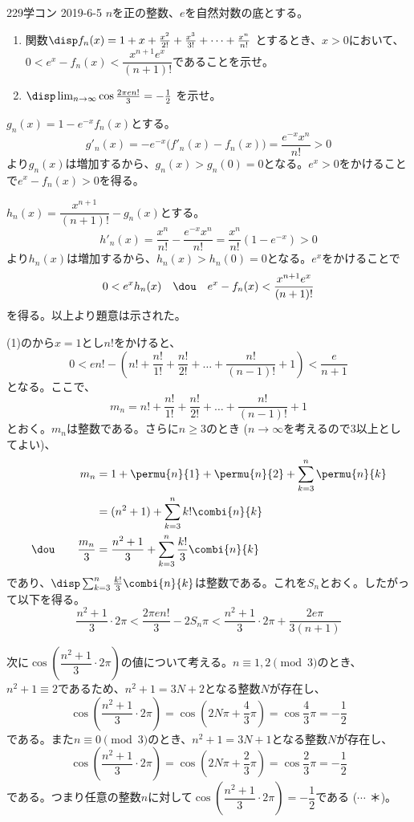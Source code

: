 \begin{prob}{229}{}{学コン 2019-6-5}
 $n$を正の整数、$e$を自然対数の底とする。
 \begin{enumerate}
  \item 関数$\disp f_n(x)=1+x+\frac{x^2}{2!}+\frac{x^3}{3!}+\dots +\frac{x^n}{n!}$ とするとき、$x>0$において、$0<e^x-f_n(x)<\dfrac{x^{n+1}e^x}{(n+1)!}$であることを示せ。
  \item $\disp \lim_{n\to\infty} \cos\frac{2\pi e n!}{3}=-\frac{1}{2}$ を示せ。
 \end{enumerate}
\end{prob}


$g_n(x)=1-e^{-x}f_n(x)$とする。
\[ g'_n(x)=-e^{-x}\bigl(f'_n(x)-f_n(x)\bigr)=\frac{e^{-x}x^n}{n!}>0 \]
より$g_n(x)$は増加するから、$g_n(x)>g_n(0)=0$となる。$e^x>0$をかけることで$e^x-f_n(x)>0$を得る。

$h_n(x)=\dfrac{x^{n+1}}{(n+1)!}-g_n(x)$とする。
\[ h'_n(x)=\frac{x^n}{n!}-\frac{e^{-x}x^n}{n!}=\frac{x^n}{n!}(1-e^{-x})>0 \]
より$h_n(x)$は増加するから、$h_n(x)>h_n(0)=0$となる。$e^x$をかけることで
\[ 0<e^xh_n(x) \quad\dou\quad e^x-f_n(x)<\frac{x^{n+1}e^x}{(n+1)!} \]
を得る。以上より題意は示された。


(1)のから$x=1$とし$n!$をかけると、
\[ 0<en!-\left(n!+\frac{n!}{1!}+\frac{n!}{2!}+\dots +\frac{n!}{(n-1)!}+1\right) < \frac{e}{n+1} \]
となる。ここで、
\[ m_n=n!+\frac{n!}{1!}+\frac{n!}{2!}+\dots +\frac{n!}{(n-1)!}+1 \]
とおく。$m_n$は整数である。さらに$n\ge 3$のとき ($n\to\infty$を考えるので3以上としてよい)、
\begin{align*}
 m_n&= 1+\permu{n}{1}+\permu{n}{2}+\sum_{k=3}^n\permu{n}{k} \\
 &= (n^2+1)+\sum_{k=3}^nk!\combi{n}{k} \\
 \dou\qquad \frac{m_n}{3}&= \frac{n^2+1}{3}+\sum_{k=3}^n\frac{k!}{3}\combi{n}{k}
\end{align*}
であり、$\disp \sum_{k=3}^n\frac{k!}{3}\combi{n}{k}$は整数である。これを$S_n$とおく。したがって以下を得る。
\[ \frac{n^2+1}{3}\cdot 2\pi < \frac{2\pi e n!}{3}-2S_n\pi < \frac{n^2+1}{3}\cdot 2\pi+\frac{2e\pi}{3(n+1)} \]

次に$\cos\left(\dfrac{n^2+1}{3}\cdot 2\pi\right)$の値について考える。$n\equiv 1, 2 \pmod{3}$のとき、$n^2+1\equiv 2$であるため、$n^2+1=3N+2$となる整数$N$が存在し、
\[ \cos\left(\frac{n^2+1}{3}\cdot 2\pi\right)=\cos\left(2N\pi+\frac{4}{3}\pi\right)=\cos\frac{4}{3}\pi=-\frac{1}{2} \]
である。また$n\equiv 0 \pmod{3}$のとき、$n^2+1=3N+1$となる整数$N$が存在し、
\[ \cos\left(\frac{n^2+1}{3}\cdot 2\pi\right)=\cos\left(2N\pi+\frac{2}{3}\pi\right)=\cos\frac{2}{3}\pi=-\frac{1}{2} \]
である。つまり任意の整数$n$に対して$\cos\left(\dfrac{n^2+1}{3}\cdot 2\pi\right)=-\dfrac{1}{2}$である ($\cdots$ ＊)。

